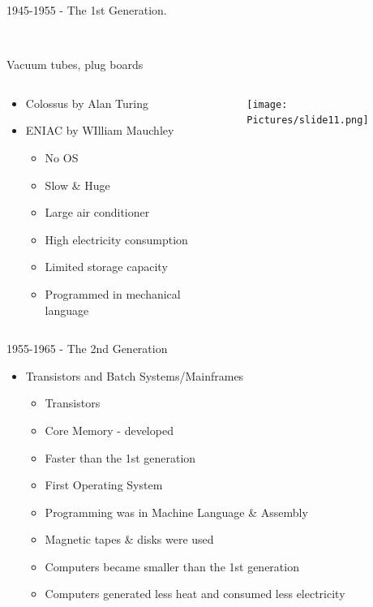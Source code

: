 \documentclass{beamer}
\begin{document}
\begin{frame}
{\centerline{1945-1955 - The 1st Generation.}\\
     \centerline{Vacuum tubes, plug boards}}
\begin{columns}
\begin{column}{0.5\linewidth}
  \begin{itemize}
    \item Colossus by Alan Turing
    \item ENIAC by WIlliam Mauchley
    \begin{itemize}
        \item No OS
        \item  Slow \& Huge
        \item Large air conditioner
        \item High electricity consumption
        \item Limited storage capacity
        \item Programmed in mechanical language
    \end{itemize}
\end{itemize}
\end{column}
\begin{column}{0.5\linewidth}
\begin{figure}
    \centering
   \texttt{[image: Pictures/slide11.png]}
\end{figure}
\end{column}
\end{columns}
\end{frame}


\begin{frame}
{\centerline{1955-1965 - The 2nd Generation}}
\begin{itemize}
    \item Transistors and Batch Systems/Mainframes
    \begin{itemize}
        \item Transistors
        \item Core Memory - developed
        \item Faster than the 1st generation
        \item First Operating System
        \item Programming was in Machine Language \& Assembly
        \item Magnetic tapes \& disks were used
        \item Computers became smaller than the 1st generation
        \item Computers generated less heat and consumed less electricity
    \end{itemize}
\end{itemize}
\end{frame}
\end{document}
